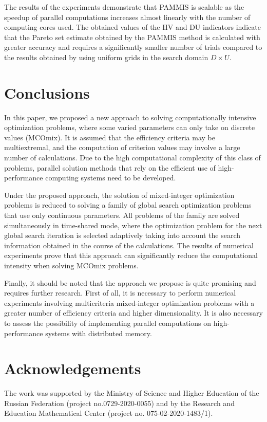 \documentclass{svproc}
\begin{document}
The results of the experiments demonstrate that PAMMIS is scalable as the  speedup of parallel computations increases almost linearly with the number of computing cores used. The obtained values of the HV and DU indicators indicate that the Pareto set estimate obtained by the PAMMIS method is calculated with greater accuracy and requires a significantly smaller number of trials compared to the results obtained by using uniform grids in the search domain $D \times U$.

\section{Conclusions}
In this paper, we proposed a new approach to solving computationally intensive optimization problems, where some varied parameters can only take on discrete values (MCOmix). It is assumed that the efficiency criteria may be multiextremal, and the computation of criterion values may involve a large number of calculations. Due to the high computational complexity of this class of problems, parallel solution methods that rely on the efficient use of high-performance computing systems need to be developed.

Under the proposed approach, the solution of mixed-integer optimization problems is reduced to solving a family of global search optimization problems that use only continuous parameters. All problems of the family are solved simultaneously in time-shared mode, where the optimization problem for the next global search iteration is selected adaptively taking into account the search information obtained in the course of the calculations.  The results of numerical experiments prove that  this approach can significantly reduce the computational intensity when solving MCOmix problems.

Finally, it should be noted that the approach we propose is quite promising and requires further research. First of all, it is necessary to perform numerical experiments involving multicriteria mixed-integer optimization problems with a greater number of efficiency criteria and higher dimensionality. It is also necessary to assess the possibility of implementing parallel computations on high-performance systems with distributed memory.

\section*{Acknowledgements}
The work was supported by the Ministry of Science and Higher Education of the Russian Federation (project no.0729-2020-0055) and by the Research and Education Mathematical Center (project no. 075-02-2020-1483/1).
\end{document}
